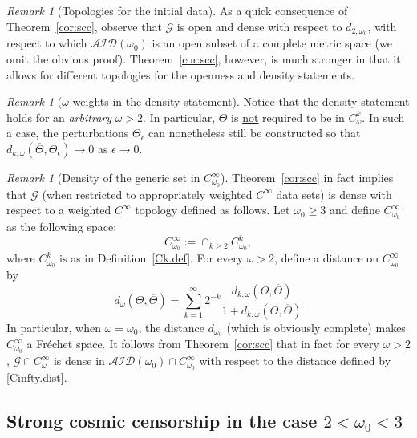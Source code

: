 \documentclass[10pt, reqno]{amsart}
\theoremstyle{definition}
\theoremstyle{remark}
\newtheorem{remark}[theorem]{Remark}
\numberwithin{equation}{section}
\newcommand{\0}{\emptyset}
\newcommand{\eps}{\epsilon}
\newcommand{\Tht}{\Theta}
\newcommand{\omg}{\omega}
\newcommand{\calA}{\mathcal A}
\newcommand{\calD}{\mathcal D}
\newcommand{\calG}{\mathcal G}
\newcommand{\calI}{\mathcal I}
\newcommand{\f}{\frac}
\begin{document}
\begin{remark}[Topologies for the initial data] \label{rem:scc-top}
As a quick consequence of Theorem~\ref{cor:scc}, observe that $\calG$ is open and dense with respect to $d_{2, \omg_{0}}$, with respect to which $\calA \calI \calD(\omg_{0})$ is an open subset of a complete metric space (we omit the obvious proof). Theorem~\ref{cor:scc}, however, is much stronger in that it allows for different topologies for the openness and density statements.
\end{remark}

\begin{remark}[$\omg$-weights in the density statement] 
Notice that the density statement holds for an \emph{arbitrary} $\omg>2$. In particular, $\overline{\Theta}$ is \underline{not} required to be in $C^k_\omg$. In such a case, the perturbations $\Tht_\eps$ can nonetheless still be constructed so that $d_{k,\omg}(\overline{\Theta}, \Theta_\eps)\to 0$ as $\eps\to 0$.
\end{remark}

\begin{remark}[Density of the generic set in $C^\infty_{\omg_0}$]\label{rmk.Cinfty}
Theorem~\ref{cor:scc} in fact implies that $\calG$ (when restricted to appropriately weighted $C^\infty$ data sets) is dense with respect to a weighted $C^\infty$ topology defined as follows. Let $\omg_0 \geq 3$ and define $C^\infty_{\omg_0}$ as the following space:
$$C^\infty_{\omg_0}:=\cap_{k\geq 2} C^k_{\omg_0}, $$
where $C^k_{\omg_0}$ is as in Definition~\ref{Ck.def}.
For every $\omg >2$, define a distance on $C^\infty_{\omg_0}$ by
\begin{equation}\label{Cinfty.dist}
d_\omg(\Theta, \overline{\Theta})= \sum_{k=1}^{\infty}2^{-k}\f{{d}_{k,\omg}(\Theta, \overline{\Theta})}{1+{d}_{k,\omg}(\Theta, \overline{\Theta})}
\end{equation}
In particular, when $\omg=\omg_0$, the distance $d_{\omg_0}$ (which is obviously complete) makes $C^\infty_{\omg_0}$ a Fr\'echet space. It follows from Theorem~\ref{cor:scc} that in fact for every $\omg > 2$, $\mathcal G\cap C^\infty_\omg$ is dense in $\calA \calI \calD (\omg_0)\cap C^\infty_{\omg_0}$ with respect to the distance defined by \eqref{Cinfty.dist}.
\end{remark}




\subsection{Strong cosmic censorship in the case $2 < \omg_{0} < 3$}\label{SCC.small.omg}
\end{document}
